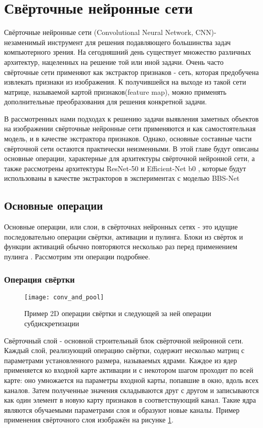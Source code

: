 \section{Свёрточные нейронные сети}


Свёрточные нейронные сети (Convolutional Neural Network, CNN)- незаменимый инструмент для решения подавляющего большинства задач компьютерного зрения.
На сегодняшний день существует множество различных архитектур, нацеленных на решение той или иной задачи.
Очень часто свёрточные сети применяют как экстрактор признаков - сеть, которая предобучена извлекать признаки из изображения. К получившейся
на выходе из такой сети матрице, называемой картой признаков(feature map), можно применять дополнительные преобразования для решения конкретной задачи.

В рассмотренных нами подходах к решению задачи выявления заметных объектов на изображении свёрточные нейронные сети
применяются и как самостоятельная модель, и в качестве экстрактора признаков. Однако, основные составные части свёрточной сети
остаются практически неизменными. В этой главе будут описаны основные операции, характерные для архитектуры свёрточной нейронной сети,
а также рассмотрены архитектуры ResNet-50\cite{ResNet} и Efficient-Net b0 \cite{Efficientnet}, которые будут использованы в качестве
экстракторов в экспериментах с моделью BBS-Net \cite{BBS}


\subsection{Основные операции}
Основные операции, или слои, в свёрточнах нейронных сетях - это идущие последовательно операции свёртки, активации и пулинга. Блоки из свёрток и
функции активаций обычно повторяются несколько раз перед применением пулинга \cite{ResNet}. Рассмотрим эти операции подробнее.

\subsubsection{Операция свёртки}

\begin{figure}[h]
    \centering
    \texttt{[image: conv\_and\_pool]}
    \caption{Пример 2D операции свёртки и следующей за ней операции субдискретизации}
    \label{fig:conv}
\end{figure}


Свёрточный слой - основной строительный блок свёрточной нейронной сети. Каждый слой, реализующий операцию свёртки,
содержит несколько матриц с параметрами установленного размера, называемых ядрами. Каждое из ядер применяется ко входной карте
активации и с некотором шагом проходит по всей карте: оно умножается на параметры входной карты, попавшие в окно, вдоль всех каналов.
Затем полученные значения складываются друг с другом и записываются как один элемент в новую карту признаков в соответствующий канал.
Такие ядра являются обучаемыми параметрами слоя и образуют новые каналы.
Пример применения свёрточного слоя изображён на рисунке \ref{fig:conv}.


